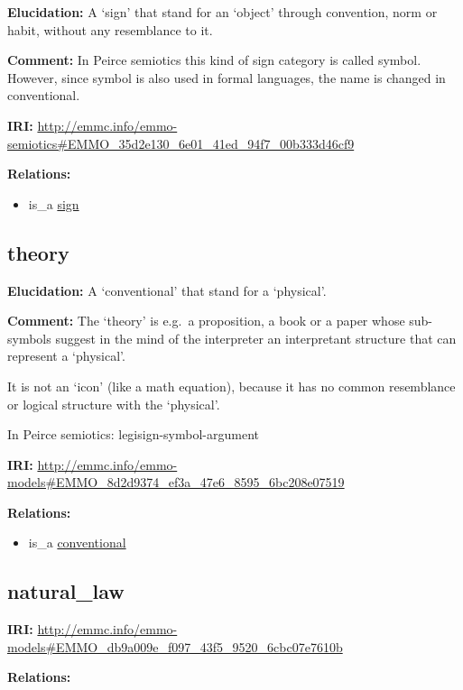 \documentclass[a4paper,]{report}
\providecommand{\tightlist}{%
  \setlength{\itemsep}{0pt}\setlength{\parskip}{0pt}}
\begin{document}
\textbf{Elucidation:} A `sign' that stand for an `object' through
convention, norm or habit, without any resemblance to it.

\textbf{Comment:} In Peirce semiotics this kind of sign category is
called symbol. However, since symbol is also used in formal languages,
the name is changed in conventional.

\textbf{IRI:}
\url{http://emmc.info/emmo-semiotics\#EMMO_35d2e130_6e01_41ed_94f7_00b333d46cf9}

\textbf{Relations:}

\begin{itemize}
\tightlist
\item
  is\_a \protect\hyperlink{sign}{sign}
\end{itemize}

\hypertarget{theory}{%
\subsection{theory}\label{theory}}

\textbf{Elucidation:} A `conventional' that stand for a `physical'.

\textbf{Comment:} The `theory' is e.g.~a proposition, a book or a paper
whose sub-symbols suggest in the mind of the interpreter an interpretant
structure that can represent a `physical'.

It is not an `icon' (like a math equation), because it has no common
resemblance or logical structure with the `physical'.

In Peirce semiotics: legisign-symbol-argument

\textbf{IRI:}
\url{http://emmc.info/emmo-models\#EMMO_8d2d9374_ef3a_47e6_8595_6bc208e07519}

\textbf{Relations:}

\begin{itemize}
\tightlist
\item
  is\_a \protect\hyperlink{conventional}{conventional}
\end{itemize}

\hypertarget{natural_law}{%
\subsection{natural\_law}\label{natural_law}}

\textbf{IRI:}
\url{http://emmc.info/emmo-models\#EMMO_db9a009e_f097_43f5_9520_6cbc07e7610b}

\textbf{Relations:}
\end{document}
